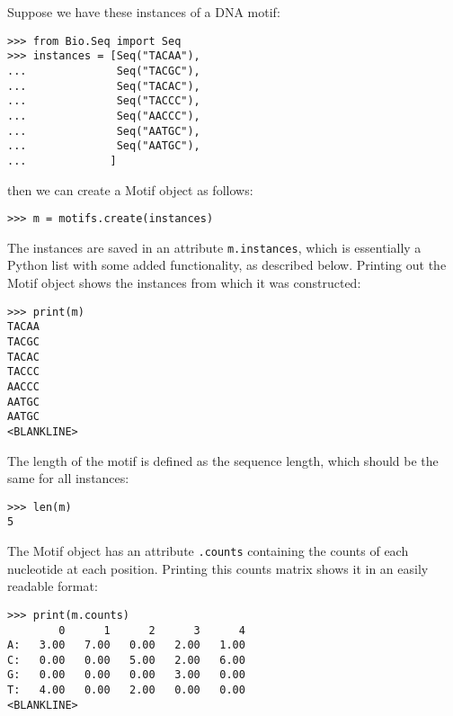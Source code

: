 Suppose we have these instances of a DNA motif:
\begin{verbatim}
>>> from Bio.Seq import Seq
>>> instances = [Seq("TACAA"),
...              Seq("TACGC"),
...              Seq("TACAC"),
...              Seq("TACCC"),
...              Seq("AACCC"),
...              Seq("AATGC"),
...              Seq("AATGC"),
...             ]
\end{verbatim}
then we can create a Motif object as follows:
\begin{verbatim}
>>> m = motifs.create(instances)
\end{verbatim}
The instances are saved in an attribute \verb+m.instances+, which is essentially a Python list with some added functionality, as described below.
Printing out the Motif object shows the instances from which it was constructed:
\begin{verbatim}
>>> print(m)
TACAA
TACGC
TACAC
TACCC
AACCC
AATGC
AATGC
<BLANKLINE>
\end{verbatim}
The length of the motif is defined as the sequence length, which should be the same for all instances:
\begin{verbatim}
>>> len(m)
5
\end{verbatim}
The Motif object has an attribute \verb+.counts+ containing the counts of each
nucleotide at each position. Printing this counts matrix shows it in an easily readable format:
\begin{verbatim}
>>> print(m.counts)
        0      1      2      3      4
A:   3.00   7.00   0.00   2.00   1.00
C:   0.00   0.00   5.00   2.00   6.00
G:   0.00   0.00   0.00   3.00   0.00
T:   4.00   0.00   2.00   0.00   0.00
<BLANKLINE>
\end{verbatim}

